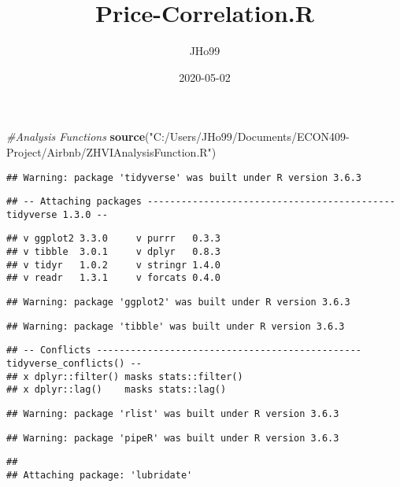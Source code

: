\documentclass[
]{article}
\title{Price-Correlation.R}
\author{JHo99}
\date{2020-05-02}
\newenvironment{Shaded}{\begin{snugshade}}{\end{snugshade}}
\newcommand{\CommentTok}[1]{\textcolor[rgb]{0.56,0.35,0.01}{\textit{#1}}}
\newcommand{\KeywordTok}[1]{\textcolor[rgb]{0.13,0.29,0.53}{\textbf{#1}}}
\newcommand{\NormalTok}[1]{#1}
\newcommand{\StringTok}[1]{\textcolor[rgb]{0.31,0.60,0.02}{#1}}
\begin{document}
\maketitle

\begin{Shaded}
\begin{Highlighting}[]
\CommentTok{#Analysis Functions}
\KeywordTok{source}\NormalTok{(}\StringTok{"C:/Users/JHo99/Documents/ECON409-Project/Airbnb/ZHVIAnalysisFunction.R"}\NormalTok{)}
\end{Highlighting}
\end{Shaded}

\begin{verbatim}
## Warning: package 'tidyverse' was built under R version 3.6.3
\end{verbatim}

\begin{verbatim}
## -- Attaching packages -------------------------------------------- tidyverse 1.3.0 --
\end{verbatim}

\begin{verbatim}
## v ggplot2 3.3.0     v purrr   0.3.3
## v tibble  3.0.1     v dplyr   0.8.3
## v tidyr   1.0.2     v stringr 1.4.0
## v readr   1.3.1     v forcats 0.4.0
\end{verbatim}

\begin{verbatim}
## Warning: package 'ggplot2' was built under R version 3.6.3
\end{verbatim}

\begin{verbatim}
## Warning: package 'tibble' was built under R version 3.6.3
\end{verbatim}

\begin{verbatim}
## -- Conflicts ----------------------------------------------- tidyverse_conflicts() --
## x dplyr::filter() masks stats::filter()
## x dplyr::lag()    masks stats::lag()
\end{verbatim}

\begin{verbatim}
## Warning: package 'rlist' was built under R version 3.6.3
\end{verbatim}

\begin{verbatim}
## Warning: package 'pipeR' was built under R version 3.6.3
\end{verbatim}

\begin{verbatim}
## 
## Attaching package: 'lubridate'
\end{verbatim}
\end{document}
